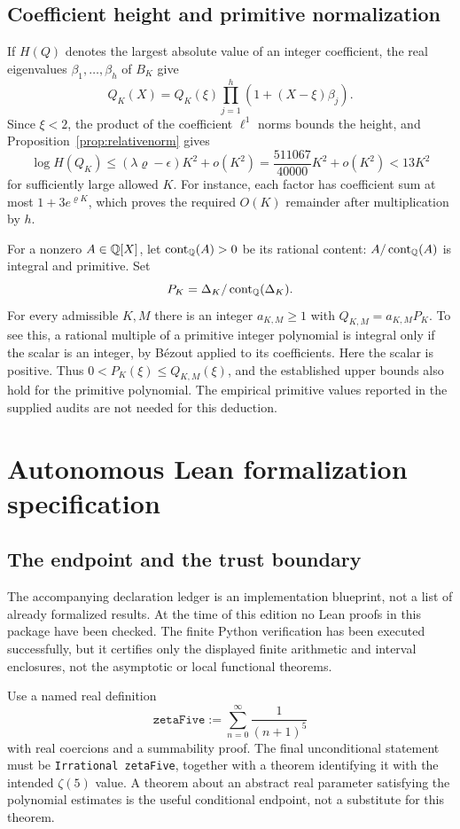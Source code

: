 \subsection{Coefficient height and primitive normalization}
If $H(Q)$ denotes the largest absolute value of an integer coefficient,
the real eigenvalues $\beta_1,\ldots,\beta_h$ of $B_K$ give
\[
 Q_K(X)=Q_K(\xi)\prod_{j=1}^h(1+(X-\xi)\beta_j).
\]
Since $\xi<2$, the product of the coefficient $\ell^1$ norms bounds the
height, and Proposition~\ref{prop:relativenorm} gives
\begin{equation}\label{eq:height}
 \log H(Q_K)\le(\lambda\varrho-\epsilon)K^2+o(K^2)
 =\frac{511067}{40000}K^2+o(K^2)<13K^2
\end{equation}
for sufficiently large allowed $K$. For instance, each factor has
coefficient sum at most $1+3e^{\varrho K}$, which proves the required
$O(K)$ remainder after multiplication by $h$.

For a nonzero $A\in\mathbb Q[X]$, let $\operatorname{cont}_{\mathbb Q}(A)>0$ be its rational
content: $A/\operatorname{cont}_{\mathbb Q}(A)$ is integral and primitive. Set
\[
 P_K=\Delta_K/\operatorname{cont}_{\mathbb Q}(\Delta_K).
\]
For every admissible $K,M$ there is an integer $a_{K,M}\ge1$ with
$Q_{K,M}=a_{K,M}P_K$. To see this, a rational multiple of a primitive
integer polynomial is integral only if the scalar is an integer, by
B\'ezout applied to its coefficients. Here the scalar is positive.
Thus $0<P_K(\xi)\le Q_{K,M}(\xi)$, and the established upper bounds
also hold for the primitive polynomial. The empirical primitive values
reported in the supplied audits are not needed for this deduction.

\section{Autonomous Lean formalization specification}
\label{app:lean}
\subsection{The endpoint and the trust boundary}
The accompanying declaration ledger is an implementation blueprint, not
a list of already formalized results. At the time of this edition no Lean
proofs in this package have been checked. The finite Python verification
has been executed successfully, but it certifies only the displayed
finite arithmetic and interval enclosures, not the asymptotic or local
functional theorems.

Use a named real definition
\[
 \texttt{zetaFive}:=\sum_{n=0}^{\infty}\frac1{(n+1)^5}
\]
with real coercions and a summability proof. The final unconditional
statement must be \texttt{Irrational zetaFive}, together with a theorem
identifying it with the intended $\zeta(5)$ value. A theorem about an
abstract real parameter satisfying the polynomial estimates is the
useful conditional endpoint, not a substitute for this theorem.

